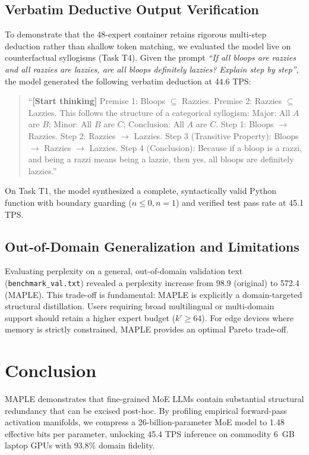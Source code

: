 \documentclass[conference]{IEEEtran}
\newcommand{\MAPLE}{\textsc{MAPLE}}
\begin{document}
\subsection{Verbatim Deductive Output Verification}
To demonstrate that the 48-expert container retains rigorous multi-step deduction rather than shallow token matching, we evaluated the model live on counterfactual syllogisms (Task T4). Given the prompt \textit{``If all bloops are razzies and all razzies are lazzies, are all bloops definitely lazzies? Explain step by step''}, the model generated the following verbatim deduction at 44.6 TPS:
\begin{quote}
\scriptsize
``\textbf{[Start thinking]} Premise 1: Bloops $\subseteq$ Razzies. Premise 2: Razzies $\subseteq$ Lazzies. This follows the structure of a categorical syllogism: Major: All $A$ are $B$; Minor: All $B$ are $C$; Conclusion: All $A$ are $C$. Step 1: Bloops $\rightarrow$ Razzies. Step 2: Razzies $\rightarrow$ Lazzies. Step 3 (Transitive Property): Bloops $\rightarrow$ Razzies $\rightarrow$ Lazzies. Step 4 (Conclusion): Because if a bloop is a razzi, and being a razzi means being a lazzie, then yes, all bloops are definitely lazzies.''
\end{quote}
On Task T1, the model synthesized a complete, syntactically valid Python function with boundary guarding ($n \le 0, n = 1$) and verified test pass rate at 45.1 TPS.

\subsection{Out-of-Domain Generalization and Limitations}
Evaluating perplexity on a general, out-of-domain validation text (\texttt{benchmark\_val.txt}) revealed a perplexity increase from 98.9 (original) to 572.4 (\MAPLE{}). This trade-off is fundamental: \MAPLE{} is explicitly a domain-targeted structural distillation. Users requiring broad multilingual or multi-domain support should retain a higher expert budget ($k' \ge 64$). For edge devices where memory is strictly constrained, \MAPLE{} provides an optimal Pareto trade-off.

\section{Conclusion}
\MAPLE{} demonstrates that fine-grained MoE LLMs contain substantial structural redundancy that can be excised post-hoc. By profiling empirical forward-pass activation manifolds, we compress a 26-billion-parameter MoE model to 1.48 effective bits per parameter, unlocking 45.4 TPS inference on commodity 6~GB laptop GPUs with 93.8\% domain fidelity.
\end{document}
